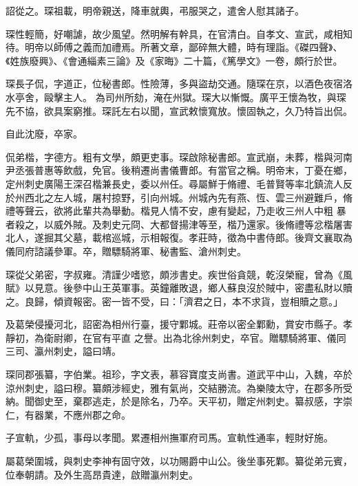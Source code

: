 \begin{pinyinscope}
 詔從之。琛祖載，明帝親送，降車就輿，弔服哭之，遣舍人慰其諸子。



 琛性輕簡，好嘲謔，故少風望。然明解有幹具，在官清白。自孝文、宣武，咸相知待。明帝以師傅之義而加禮焉。所著文章，鄙碎無大體，時有理詣。《磔四聲》、《姓族廢興》、《會通緇素三論》及《家晦》二十篇，《篤學文》一卷，頗行於世。



 琛長子侃，字道正，位秘書郎。性險薄，多與盜劫交通。隨琛在京，以酒色夜宿洛水亭舍，毆擊主人。
 為司州所劾，淹在州獄。琛大以慚慨。廣平王懷為牧，與琛先不協，欲具案窮推。琛託左右以聞，宣武敕懷寬放。懷固執之，久乃特旨出侃。



 自此沈廢，卒家。



 侃弟楷，字德方。粗有文學，頗更吏事。琛啟除秘書郎。宣武崩，未葬，楷與河南尹丞張普惠等飲戲，免官。後稍遷尚書儀曹郎。有當官之稱。明帝末，丁憂在鄉，定州刺史廣陽王深召楷兼長史，委以州任。尋屬鮮于脩禮、毛普賢等率北鎮流人反於州西北之左人城，屠村掠野，引向州城。州城內先有燕、恆、雲三州避難戶，脩禮等聲云，欲將此輩共為舉動。楷見人情不安，慮有變起，乃走收三州人中粗
 暴者殺之，以威外賊。及刺史元冏、大都督揚津等至，楷乃還家。後脩禮等忿楷屠害北人，遂掘其父墓，載棺巡城，示相報復。孝莊時，徵為中書侍郎。後齊文襄取為儀同府諮議參軍。卒，贈驃騎將軍、秘書監、滄州刺史。



 琛從父弟密，字叔雍。清謹少嗜慾，頗涉書史。疾世俗貪競，乾沒榮寵，曾為《風賦》以見意。後參中山王英軍事。英鐘離敗退，鄉人蘇良沒於賊中，密盡私財以贖之。良歸，傾資報密。密一皆不受，曰：「濟君之日，本不求貨，豈相贖之意。」



 及葛榮侵擾河北，詔密為相州行臺，援守鄴城。莊帝以密全鄴勳，賞安市縣子。孝靜初，為衛尉卿，在官有平直
 之譽。出為北徐州刺史，卒官。贈驃騎將軍、儀同三司、瀛州刺史，謚曰靖。



 琛同郡張纂，字伯業。祖珍，字文表，慕容寶度支尚書。道武平中山，入魏，卒於涼州刺史，謚曰穆。纂頗涉經史，雅有氣尚，交結勝流。為樂陵太守，在郡多所受納。聞御史至，棄郡逃走，於是除名，乃卒。天平初，贈定州刺史。纂叔感，字崇仁，有器業，不應州郡之命。



 子宣軌，少孤，事母以孝聞。累遷相州撫軍府司馬。宣軌性通率，輕財好施。



 屬葛榮圍城，與刺史李神有固守效，以功賜爵中山公。後坐事死鄴。纂從弟元賓，位奉朝請。及外生高昂貴達，啟贈瀛州刺史。




\end{pinyinscope}
